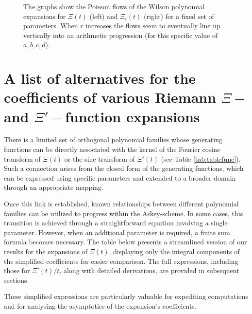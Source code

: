 \documentclass[a4paper,11pt,twoside]{amsart}
\begin{document}
\begin{small}
\begin{figure}[H]
  \caption{The graphs show the Poisson flows of the Wilson polynomial expansions for $\Xi(t)$ (left) and $\Xi_i(t)$ (right) for a fixed set of parameters. When $r$ increases the flows seem to eventually line up vertically into an arithmetic progression (for this specific value of $a,b,c,d$).}
  \label{fig:flowW2}
\end{figure}
\end{small}
\pagebreak

\renewcommand{\theequation}{B.\arabic{equation}}
\setcounter{equation}{0}
\section{A list of alternatives for the coefficients of various Riemann $\Xi-$ and $\Xi'-$function expansions}\label{specexpansions}

There is a limited set of orthogonal polynomial families whose generating functions can be directly associated with the kernel of the Fourier cosine transform of $\Xi(t)$ or the sine transform of $\Xi'(t)$ (see Table \ref{tab:tablefunc}). Such a connection arises from the closed form of the generating functions, which can be expressed using specific parameters and extended to a broader domain through an appropriate mapping.

Once this link is established, known relationships between different polynomial families can be utilized to progress within the Askey-scheme. In some cases, this transition is achieved through a straightforward equation involving a single parameter. However, when an additional parameter is required, a finite sum formula becomes necessary. The table below presents a streamlined version of our results for the expansions of $\Xi(t)$, displaying only the integral components of the simplified coefficients for easier comparison. The full expressions, including those for $\Xi'(t)/t$, along with detailed derivations, are provided in subsequent sections. 

These simplified expressions are particularly valuable for expediting computations and for analysing the asymptotics of the expansion's coefficients.
\end{document}
